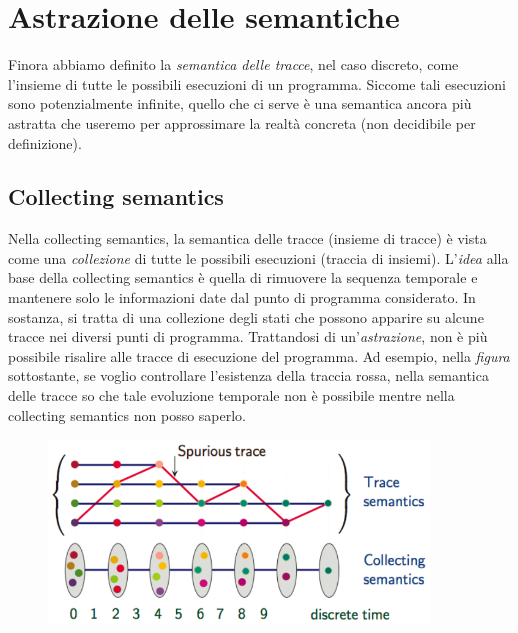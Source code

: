 \documentclass[a4paper,oneside,titlepage]{book}
\begin{document}
\section{Astrazione delle semantiche} %
Finora abbiamo definito la \textit{semantica delle tracce}, nel caso discreto, come l'insieme di tutte le possibili esecuzioni di un programma. Siccome tali esecuzioni sono potenzialmente infinite, quello che ci serve è una semantica ancora più astratta che useremo per approssimare la realtà concreta (non decidibile per definizione).

\subsection{Collecting semantics}
Nella collecting semantics, la semantica delle tracce (insieme di tracce) è vista come una \textit{collezione} di tutte le possibili esecuzioni (traccia di insiemi). L'\textit{idea} alla base della collecting semantics è quella di rimuovere la sequenza temporale e mantenere solo le informazioni date dal punto di programma considerato. In sostanza, si tratta di una collezione degli stati che possono apparire su alcune tracce nei diversi punti di programma. Trattandosi di un'\textit{astrazione}, non è più possibile risalire alle tracce di esecuzione del programma. Ad esempio, nella \textit{figura} sottostante, se voglio controllare l'esistenza della traccia rossa, nella semantica delle tracce so che tale evoluzione temporale non è possibile mentre nella collecting semantics non posso saperlo.
\begin{figure}[htp]
	\centering
	\includegraphics[width=0.9\textwidth]{tr_vs_cs.png}
\end{figure}
\end{document}
